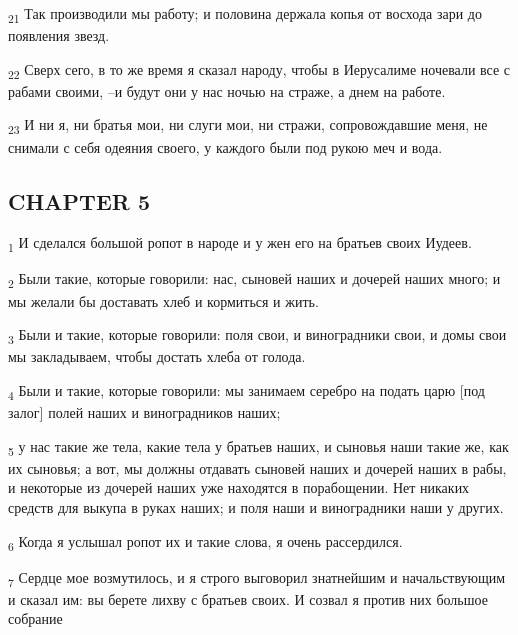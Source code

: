 \begin{tcolorbox}
\textsubscript{21} Так производили мы работу; и половина держала копья от восхода зари до появления звезд.
\end{tcolorbox}
\begin{tcolorbox}
\textsubscript{22} Сверх сего, в то же время я сказал народу, чтобы в Иерусалиме ночевали все с рабами своими, --и будут они у нас ночью на страже, а днем на работе.
\end{tcolorbox}
\begin{tcolorbox}
\textsubscript{23} И ни я, ни братья мои, ни слуги мои, ни стражи, сопровождавшие меня, не снимали с себя одеяния своего, у каждого были под рукою меч и вода.
\end{tcolorbox}
\subsection{CHAPTER 5}
\begin{tcolorbox}
\textsubscript{1} И сделался большой ропот в народе и у жен его на братьев своих Иудеев.
\end{tcolorbox}
\begin{tcolorbox}
\textsubscript{2} Были такие, которые говорили: нас, сыновей наших и дочерей наших много; и мы желали бы доставать хлеб и кормиться и жить.
\end{tcolorbox}
\begin{tcolorbox}
\textsubscript{3} Были и такие, которые говорили: поля свои, и виноградники свои, и домы свои мы закладываем, чтобы достать хлеба от голода.
\end{tcolorbox}
\begin{tcolorbox}
\textsubscript{4} Были и такие, которые говорили: мы занимаем серебро на подать царю [под залог] полей наших и виноградников наших;
\end{tcolorbox}
\begin{tcolorbox}
\textsubscript{5} у нас такие же тела, какие тела у братьев наших, и сыновья наши такие же, как их сыновья; а вот, мы должны отдавать сыновей наших и дочерей наших в рабы, и некоторые из дочерей наших уже находятся в порабощении. Нет никаких средств для выкупа в руках наших; и поля наши и виноградники наши у других.
\end{tcolorbox}
\begin{tcolorbox}
\textsubscript{6} Когда я услышал ропот их и такие слова, я очень рассердился.
\end{tcolorbox}
\begin{tcolorbox}
\textsubscript{7} Сердце мое возмутилось, и я строго выговорил знатнейшим и начальствующим и сказал им: вы берете лихву с братьев своих. И созвал я против них большое собрание
\end{tcolorbox}
